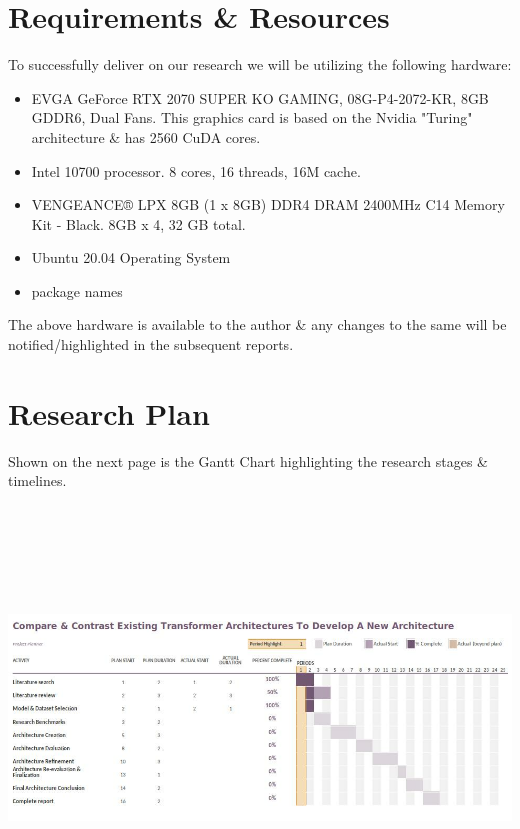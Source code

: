 \documentclass[11pt]{article}
\begin{document}
\section{Requirements \& Resources}\label{resources}

To successfully deliver on our research we will be utilizing the following hardware:
\begin{itemize}
    \item EVGA GeForce RTX 2070 SUPER KO GAMING, 08G-P4-2072-KR, 8GB GDDR6, Dual Fans\cite{2070}. This graphics card is based on the Nvidia "Turing" architecture \& has 2560 CuDA cores.
    \item Intel 10700 processor. 8 cores, 16 threads, 16M cache\cite{intel}.
    \item VENGEANCE® LPX 8GB (1 x 8GB) DDR4 DRAM 2400MHz C14 Memory Kit - Black\cite{ram}. 8GB x 4, 32 GB total.
    \item Ubuntu 20.04 Operating System
    \item package names
\end{itemize}

The above hardware is available to the author \& any changes to the same will be notified/highlighted in the subsequent reports.
\section{Research Plan}\label{plan}

Shown on the next page is the Gantt Chart highlighting the research stages \& timelines.\\
\includegraphics[width=180mm,height=120mm,angle=90]{g2.png}
\newpage


\end{document}
